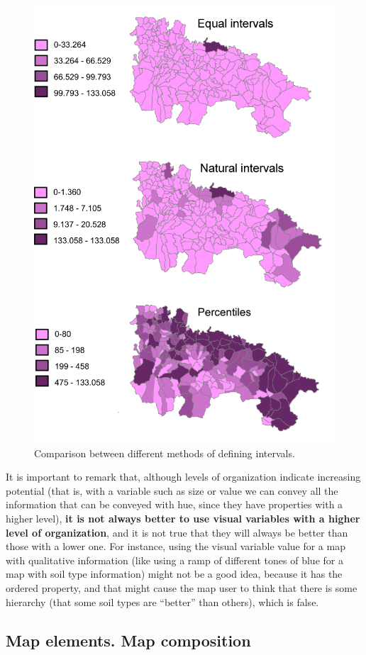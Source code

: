 \begin{itemize}
	\begin{figure}[!hbt]
	\centering
	\includegraphics[width=.7\columnwidth]{Visualization/IntervalClasses.png}
	\caption{\small Comparison between different methods of defining intervals.}
	\label{Fig:IntervalClasses} 
	\end{figure}


\end{itemize}


It is important to remark that, although levels of organization indicate increasing potential (that is, with a variable such as size or value we can convey all the information that can be conveyed with hue, since they have properties with a higher level), \textbf{it is not always better to use visual variables with a higher level of organization}, and it is not true that they will always be better than those with a lower one. For instance, using the visual variable value for a map with qualitative information (like using a ramp of different tones of blue for a map with soil type information) might not be a good idea, because it has the ordered property, and that might cause the map user to think that there is some hierarchy (that some soil types are ``better'' than others), which is false.


\subsection{Map elements. Map composition}


